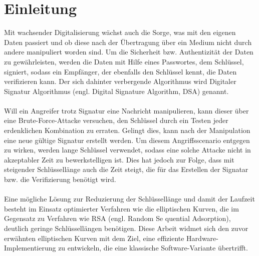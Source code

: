 \chapter{Einleitung}
Mit wachsender Digitalisierung wächst auch die Sorge, was mit den eigenen Daten passiert und ob diese nach der Übertragung über ein Medium nicht durch andere manipuliert worden sind. Um die Sicherheit bzw. Authentizität der Daten zu gewährleisten, werden die Daten mit Hilfe eines Passwortes, dem Schlüssel, signiert, sodass ein Empfänger, der ebenfalls den Schlüssel kennt, die Daten verifizieren kann. Der sich dahinter verbergende Algorithmus wird Digitaler Signatur Algorithmus (engl. Digital Signature Algorithm, DSA) genannt.
\\ \\
Will ein Angreifer trotz Signatur eine Nachricht manipulieren, kann dieser über eine Brute-Force-Attacke versuchen, den Schlüssel durch ein Testen jeder erdenklichen Kombination zu erraten. Gelingt dies, kann nach der Manipulation eine neue gültige Signatur erstellt werden. Um diesem Angriffsscenario entgegen zu wirken, werden lange Schlüssel verwendet, sodass eine solche Attacke nicht in akzeptabler Zeit zu bewerkstelligen ist. Dies hat jedoch zur Folge, dass mit steigender Schlüssellänge auch die Zeit steigt, die für das Erstellen der Signatar bzw. die Verifizierung benötigt wird. 
\\ \\
Eine mögliche Lösung zur Reduzierung der Schlüssellänge und damit der Laufzeit besteht im Einsatz optimierter Verfahren wie die elliptischen Kurven, die im Gegensatz zu Verfahren wie RSA (engl. Random Se
quential Adsorption), deutlich geringe Schlüssellängen benötigen. Diese Arbeit widmet sich den zuvor erwähnten elliptischen Kurven mit dem Ziel, eine effiziente Hardware-Implementierung zu entwickeln, die eine klassische Software-Variante übertrifft.
